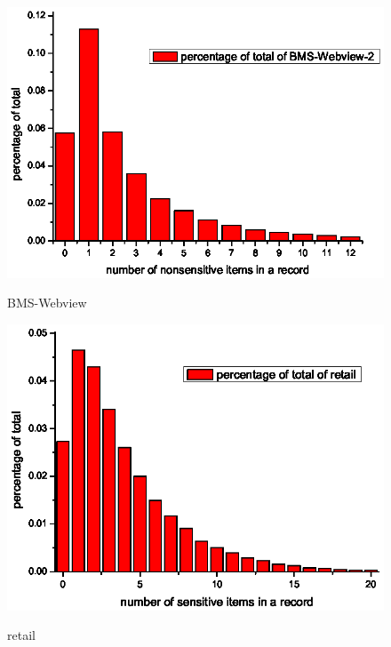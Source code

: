 \documentclass{article}
\begin{document}
\begin{figure}[htb]
   \centering
  \includegraphics[scale=.8]{wbnon.eps}\\
  \caption{BMS-Webview}\label{fig:graph}
\end{figure}

\begin{figure}[htb]
   \centering
  \includegraphics[scale=.8]{retailnon.eps}\\
  \caption{retail}\label{fi
  g:graph}
\end{figure}
\end{document}
